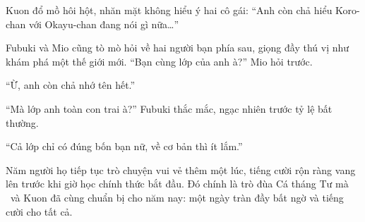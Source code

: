 \documentclass[../main.tex]{subfiles}
\begin{document}
Kuon đổ mồ hôi hột, nhăn mặt không hiểu ý hai cô gái: ``Anh còn chả hiểu Koro-chan với Okayu-chan đang nói gì nữa\dots''

Fubuki và Mio cũng tò mò hỏi về hai người bạn phía sau, giọng đầy thú vị như khám phá một thế giới mới. ``Bạn cùng lớp của anh à?'' Mio hỏi trước.

``Ừ, anh còn chả nhớ tên hết.''

``Mà lớp anh toàn con trai à?'' Fubuki thắc mắc, ngạc nhiên trước tỷ lệ bất thường.

``Cả lớp chỉ có đúng bốn bạn nữ, về cơ bản thì ít lắm.''

Năm người họ tiếp tục trò chuyện vui vẻ thêm một lúc, tiếng cười rộn ràng vang lên trước khi giờ học chính thức bắt đầu. Đó chính là trò đùa Cá tháng Tư mà \hll\ và Kuon đã cùng chuẩn bị cho năm nay: một ngày tràn đầy bất ngờ và tiếng cười cho tất cả.
\end{document}
